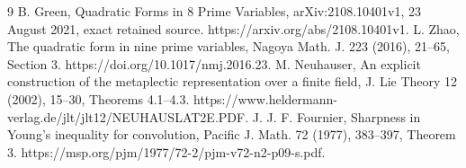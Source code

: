 \documentclass[10pt]{article}
\begin{document}
9 B. Green, Quadratic Forms in 8 Prime Variables, arXiv:2108.10401v1, 23 August 2021, exact retained source. https://arxiv.org/abs/2108.10401v1. L. Zhao, The quadratic form in nine prime variables, Nagoya Math. J. 223 (2016), 21–65, Section 3. https://doi.org/10.1017/nmj.2016.23. M. Neuhauser, An explicit construction of the metaplectic representation over a finite field, J. Lie Theory 12 (2002), 15–30, Theorems 4.1–4.3. https://www.heldermann-verlag.de/jlt/jlt12/NEUHAUSLAT2E.PDF. J. J. F. Fournier, Sharpness in Young’s inequality for convolution, Pacific J. Math. 72 (1977), 383–397, Theorem 3. https://msp.org/pjm/1977/72-2/pjm-v72-n2-p09-s.pdf.\par
\end{document}
